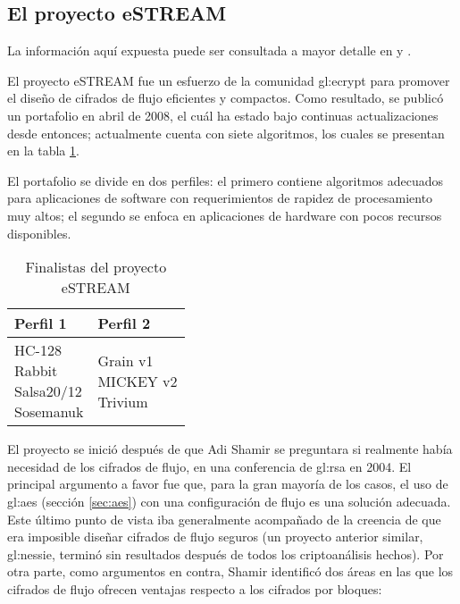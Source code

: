 %
%

\subsection{El proyecto eSTREAM}

La información aquí expuesta puede ser consultada a mayor detalle en
\cite{resultados_estream_1, resultados_estream_2} y \cite{estream_portafolio}.

El proyecto eSTREAM fue un esfuerzo de la comunidad \acrshort{gl:ecrypt} para
promover el diseño de cifrados de flujo eficientes y compactos. Como resultado,
se publicó un portafolio en abril de 2008, el cuál ha estado bajo continuas
actualizaciones desde entonces; actualmente cuenta con siete algoritmos, los
cuales se presentan en la tabla \ref{portafolio_estream}.

El portafolio se divide en dos perfiles: el primero contiene algoritmos
adecuados para aplicaciones de software con requerimientos de rapidez de
procesamiento muy altos; el segundo se enfoca en aplicaciones de hardware con
pocos recursos disponibles.

\begin{table}
  \centering
  \begin{tabular}{| m{0.85in} | m{0.85in} |}
    \hline
    \textbf{Perfil 1} & \textbf{Perfil 2} \\ [0.5ex]
    \hline
    \makecell{HC-128 \\ Rabbit \\ Salsa20/12 \\ Sosemanuk} &
    \makecell{Grain v1 \\ MICKEY v2 \\ Trivium} \\
    \hline
  \end{tabular}
  \caption{Finalistas del proyecto eSTREAM}
  \label{portafolio_estream}
\end{table}

El proyecto se inició después de que Adi Shamir se preguntara si realmente
había necesidad de los cifrados de flujo, en una conferencia de
\acrshort{gl:rsa} en 2004. El principal argumento a favor fue que, para la gran
mayoría de los casos, el uso de \acrshort{gl:aes} (sección \ref{sec:aes}) con
una configuración de flujo es una solución adecuada. Este último punto de vista
iba generalmente acompañado de la creencia de que era imposible diseñar cifrados
de flujo seguros (un proyecto anterior similar, \acrshort{gl:nessie}, terminó
sin resultados después de todos los criptoanálisis hechos). Por otra parte,
como argumentos en contra, Shamir identificó dos áreas en las que los cifrados
de flujo ofrecen ventajas respecto a los cifrados por bloques:

